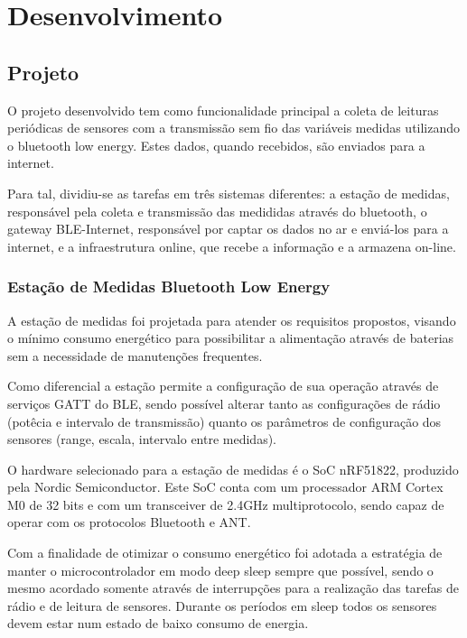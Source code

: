 \section{Desenvolvimento}

\subsection{Projeto}

O projeto desenvolvido tem como funcionalidade principal a coleta de leituras periódicas de sensores com a transmissão sem fio das variáveis medidas utilizando o bluetooth low energy. Estes dados, quando recebidos, são enviados para a internet.

Para tal, dividiu-se as tarefas em três sistemas diferentes: a estação de medidas, responsável pela coleta e transmissão das medididas através do bluetooth, o gateway BLE-Internet, responsável por captar os dados no ar e enviá-los para a internet, e a infraestrutura online, que recebe a informação e a armazena on-line.

\subsubsection{Estação de Medidas Bluetooth Low Energy}

A estação de medidas foi projetada para atender os requisitos propostos, visando o mínimo consumo energético para possibilitar a alimentação através de baterias sem a necessidade de manutenções frequentes.

Como diferencial a estação permite a configuração de sua operação através de serviços GATT do BLE, sendo possível alterar tanto as configurações de rádio (potêcia e intervalo de transmissão) quanto os parâmetros de configuração dos sensores (range, escala, intervalo entre medidas).

O hardware selecionado para a estação de medidas é o SoC nRF51822, produzido pela Nordic Semiconductor. Este SoC conta com um processador ARM Cortex M0 de 32 bits e com um transceiver de 2.4GHz multiprotocolo, sendo capaz de operar com os protocolos Bluetooth e ANT.\cite{nRF51ProdSpec}

Com a finalidade de otimizar o consumo energético foi adotada a estratégia de manter o microcontrolador em modo deep sleep sempre que possível, sendo o mesmo acordado somente através de interrupções para a realização das tarefas de rádio e de leitura de sensores. Durante os períodos em sleep todos os sensores devem estar num estado de baixo consumo de energia.

